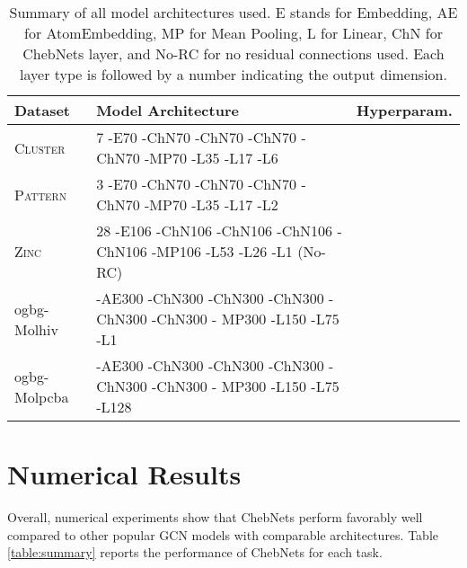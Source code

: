 \documentclass[letterpaper]{article} \usepackage{aaai21}  \usepackage{times}  \usepackage{helvet} \usepackage{courier}  \usepackage[hyphens]{url}  \usepackage{graphicx} \usepackage{natbib}  \usepackage{caption} \frenchspacing  \setlength{\pdfpagewidth}{8.5in}  \setlength{\pdfpageheight}{11in}
\begin{document}
\begin{table*}[ht!]
\centering
\begin{tabular}{@{}llc@{}}
\toprule
Dataset           &   Model Architecture                     & Hyperparam.          \\ \midrule
\textsc{Cluster}  & 7 -E70 -ChN70 -ChN70 -ChN70 -ChN70 -MP70 -L35 -L17 -L6 &  \\
\textsc{Pattern}  & 3 -E70 -ChN70 -ChN70 -ChN70 -ChN70 -MP70 -L35 -L17 -L2 &  \\
\textsc{Zinc}     & 28 -E106 -ChN106 -ChN106 -ChN106 -ChN106 -MP106 -L53 -L26 -L1 (No-RC) & \\
ogbg-Molhiv  &   -AE300 -ChN300 -ChN300 -ChN300 -ChN300 -ChN300 - MP300 -L150 -L75 -L1 &    \\
ogbg-Molpcba &   -AE300 -ChN300 -ChN300 -ChN300 -ChN300 -ChN300 - MP300 -L150 -L75 -L128 &  \\ \bottomrule
\end{tabular}
\caption{Summary of all model architectures used. E stands for Embedding, AE for AtomEmbedding,  MP for Mean Pooling, L for Linear, ChN for ChebNets layer, and No-RC for no residual connections used. Each layer type is followed by a number indicating the output dimension.}
\label{tab:models}
\end{table*}



\section{Numerical Results}

Overall, numerical experiments show that ChebNets perform favorably well compared to other popular GCN models with comparable architectures. Table \ref{table:summary} reports the performance of ChebNets for each task.
\end{document}
